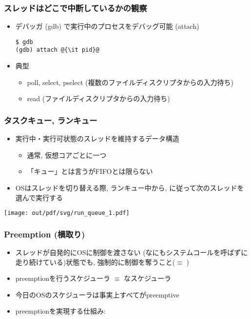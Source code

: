 \documentclass[12pt,dvipdfmx]{beamer}
\begin{document}
\begin{frame}[fragile]
  \frametitle{スレッドはどこで中断しているかの観察}
  \begin{itemize}
  \item デバッガ (gdb) で実行中のプロセスをデバッグ可能 (attach)
\begin{lstlisting}
$ gdb
(gdb) attach @{\it pid}@
\end{lstlisting} %
\item 典型
  \begin{itemize}
  \item poll, select, pselect (複数のファイルディスクリプタからの入力待ち)
  \item read (ファイルディスクリプタからの入力待ち)
  \end{itemize}
\end{itemize}
\end{frame}

\begin{frame}
  \frametitle{タスクキュー, ランキュー}
  \begin{itemize}
  \item 実行中・実行可状態のスレッドを維持するデータ構造
    \begin{itemize}
    \item 通常, 仮想コアごとに一つ
    \item 「キュー」とは言うがFIFOとは限らない
    \end{itemize}
  \item OSはスレッドを切り替える際,
    ランキュー中から, に従って次のスレッドを選んで実行する
  \end{itemize}

  \begin{center}
    \texttt{[image: out/pdf/svg/run\_queue\_1.pdf]}
  \end{center}
  
\end{frame}

\begin{frame}
  \frametitle{Preemption (横取り)}
  \begin{itemize}
  \item スレッドが自発的にOSに制御を渡さない
    (なにもシステムコールを呼ばずに走り続けている)状態でも,
    強制的に制御を奪うこと($\equiv$ )
  \item preemptionを行うスケジューラ $\equiv$ なスケジューラ
  \item 今日のOSのスケジューラは事実上すべてがpreemptive
  \item preemptionを実現する仕組み: 
  \end{itemize}
\end{frame}
\end{document}
